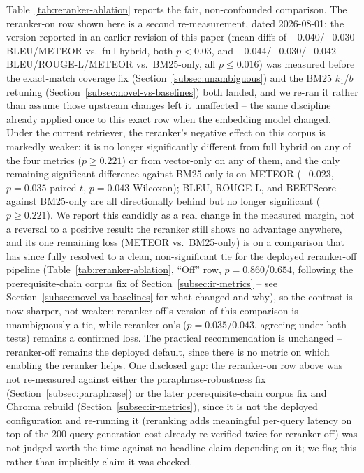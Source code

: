\documentclass[a4paper,twoside]{article}
\begin{document}
Table~\ref{tab:reranker-ablation} reports the fair, non-confounded comparison. The reranker-on row shown here is a second re-measurement, dated 2026-08-01: the version reported in an earlier revision of this paper (mean diffs of $-0.040$/$-0.030$ BLEU/METEOR vs.\ full hybrid, both $p<0.03$, and $-0.044$/$-0.030$/$-0.042$ BLEU/ROUGE-L/METEOR vs.\ BM25-only, all $p\leq0.016$) was measured before the exact-match coverage fix (Section~\ref{subsec:unambiguous}) and the BM25 $k_1$/$b$ retuning (Section~\ref{subsec:novel-vs-baselines}) both landed, and we re-ran it rather than assume those upstream changes left it unaffected -- the same discipline already applied once to this exact row when the embedding model changed. Under the current retriever, the reranker's negative effect on this corpus is markedly weaker: it is no longer significantly different from full hybrid on any of the four metrics ($p\geq0.221$) or from vector-only on any of them, and the only remaining significant difference against BM25-only is on METEOR ($-0.023$, $p=0.035$ paired $t$, $p=0.043$ Wilcoxon); BLEU, ROUGE-L, and BERTScore against BM25-only are all directionally behind but no longer significant ($p\geq0.221$). We report this candidly as a real change in the measured margin, not a reversal to a positive result: the reranker still shows no advantage anywhere, and its one remaining loss (METEOR vs.\ BM25-only) is on a comparison that has since fully resolved to a clean, non-significant tie for the deployed reranker-off pipeline (Table~\ref{tab:reranker-ablation}, ``Off'' row, $p=0.860$/$0.654$, following the prerequisite-chain corpus fix of Section~\ref{subsec:ir-metrics} -- see Section~\ref{subsec:novel-vs-baselines} for what changed and why), so the contrast is now sharper, not weaker: reranker-off's version of this comparison is unambiguously a tie, while reranker-on's ($p=0.035$/$0.043$, agreeing under both tests) remains a confirmed loss. The practical recommendation is unchanged -- reranker-off remains the deployed default, since there is no metric on which enabling the reranker helps. One disclosed gap: the reranker-on row above was not re-measured against either the paraphrase-robustness fix (Section~\ref{subsec:paraphrase}) or the later prerequisite-chain corpus fix and Chroma rebuild (Section~\ref{subsec:ir-metrics}), since it is not the deployed configuration and re-running it (reranking adds meaningful per-query latency on top of the 200-query generation cost already re-verified twice for reranker-off) was not judged worth the time against no headline claim depending on it; we flag this rather than implicitly claim it was checked.
\end{document}
